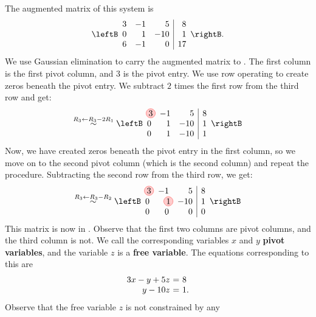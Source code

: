 \begin{solution} The augmented matrix of this system is
  \begin{equation*}
    \leftB
    \begin{array}{rrr|r}
      3 &  -1  &  5 & 8 \\
      0 &   1 & -10 & 1 \\
      6 &  -1  &  0 & 17
    \end{array}
    \rightB.
  \end{equation*}
  We use Gaussian elimination to carry the augmented matrix to
  {\ef}. The first column is the first pivot column, and $3$ is the
  pivot entry. We use row operating to create zeros beneath the pivot
  entry. We subtract $2$ times the first row from the third row and get:
  \begin{equation*}
  \stackrel{R_3\leftarrow R_3-2R_1}{\sim}
    \leftB
    \begin{array}{rrr|r}
      \circled{3} &  -1  &  5 & 8 \\
      0 &   1 & -10 & 1 \\
      0 &   1 & -10 & 1
    \end{array}
    \rightB 
  \end{equation*}
  Now, we have created zeros beneath the pivot entry in the first
  column, so we move on to the second pivot column (which is the
  second column) and repeat the procedure. Subtracting the second row
  from the third row, we get:
  \begin{equation*}
  \stackrel{R_3\leftarrow R_3-R_2}{\sim}
    \leftB
    \begin{array}{rrr|r}
      \circled{3} &  -1  &  5 & 8 \\
      0 &   \circled{1} & -10 & 1 \\
      0 &   0 & 0 & 0
    \end{array}
    \rightB
  \end{equation*}
  This matrix is now in {\ef}. Observe that the first two columns are
  pivot columns, and the third column is not. We call the
  corresponding variables $x$ and $y$
  \textbf{pivot variables},
  and the variable $z$ is a
  \textbf{free variable}.
  The equations corresponding to
  this {\ef} are
  \[
    \begin{array}{r@{~}c@{~}l}
      3x - y + 5z &=& 8 \\
      y - 10z &=& 1. 
    \end{array}
  \]
  Observe that the free variable $z$ is not constrained by any

\end{solution}

